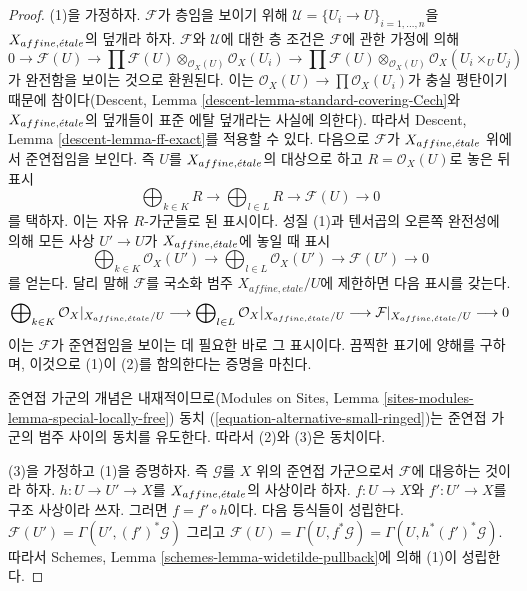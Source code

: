 \begin{proof}
(1)을 가정하자. $\mathcal{F}$가 층임을 보이기 위해
$\mathcal{U}=\{U_i\to U\}_{i=1,\ldots,n}$을
$X_{affine,{\acute{e}tale}}$의 덮개라 하자. $\mathcal{F}$와 $\mathcal{U}$에
대한 층 조건은 $\mathcal{F}$에 관한 가정에 의해
$$
0 \to \mathcal{F}(U) \to
\prod \mathcal{F}(U) \otimes_{\mathcal{O}_X(U)} \mathcal{O}_X(U_i) \to
\prod \mathcal{F}(U) \otimes_{\mathcal{O}_X(U)} \mathcal{O}_X(U_i \times_U U_j)
$$
가 완전함을 보이는 것으로 환원된다. 이는
$\mathcal{O}_X(U)\to\prod\mathcal{O}_X(U_i)$가 충실 평탄이기 때문에
참이다(Descent, Lemma \ref{descent-lemma-standard-covering-Cech}와
$X_{affine,{\acute{e}tale}}$의 덮개들이 표준 에탈 덮개라는 사실에 의한다).
따라서 Descent, Lemma \ref{descent-lemma-ff-exact}를 적용할 수 있다.
다음으로 $\mathcal{F}$가 $X_{affine,{\acute{e}tale}}$ 위에서 준연접임을 보인다.
즉 $U$를 $X_{affine,{\acute{e}tale}}$의 대상으로 하고 $R=\mathcal{O}_X(U)$로
놓은 뒤 표시
$$
\bigoplus\nolimits_{k \in K} R
\longrightarrow
\bigoplus\nolimits_{l \in L} R
\longrightarrow
\mathcal{F}(U)
\longrightarrow 0
$$
를 택하자. 이는 자유 $R$-가군들로 된 표시이다. 성질 (1)과 텐서곱의
오른쪽 완전성에 의해 모든 사상 $U'\to U$가 $X_{affine,{\acute{e}tale}}$에
놓일 때 표시
$$
\bigoplus\nolimits_{k \in K} \mathcal{O}_X(U')
\longrightarrow
\bigoplus\nolimits_{l \in L} \mathcal{O}_X(U')
\longrightarrow
\mathcal{F}(U')
\longrightarrow 0
$$
를 얻는다. 달리 말해 $\mathcal{F}$를 국소화 범주
$X_{affine, etale}/U$에 제한하면 다음 표시를 갖는다.
$$
\bigoplus\nolimits_{k \in K} \mathcal{O}_X|_{X_{affine, {\acute{e}tale}}/U}
\longrightarrow
\bigoplus\nolimits_{l \in L} \mathcal{O}_X|_{X_{affine, {\acute{e}tale}}/U}
\longrightarrow
\mathcal{F}|_{X_{affine, {\acute{e}tale}}/U}
\longrightarrow 0
$$
이는 $\mathcal{F}$가 준연접임을 보이는 데 필요한 바로 그 표시이다.
끔찍한 표기에 양해를 구하며, 이것으로 (1)이 (2)를 함의한다는 증명을
마친다.

\medskip\noindent
준연접 가군의 개념은 내재적이므로(Modules on Sites, Lemma
\ref{sites-modules-lemma-special-locally-free}) 동치
(\ref{equation-alternative-small-ringed})는 준연접 가군의 범주 사이의
동치를 유도한다. 따라서 (2)와 (3)은 동치이다.

\medskip\noindent
(3)을 가정하고 (1)을 증명하자. 즉 $\mathcal{G}$를 $X$ 위의 준연접
가군으로서 $\mathcal{F}$에 대응하는 것이라 하자.
$h:U\to U'\to X$를 $X_{affine,{\acute{e}tale}}$의 사상이라 하자.
$f:U\to X$와 $f':U'\to X$를 구조 사상이라 쓰자.
그러면 $f=f'\circ h$이다. 다음 등식들이 성립한다.
$\mathcal{F}(U')=\Gamma(U',(f')^*\mathcal{G})$ 그리고
$\mathcal{F}(U)=\Gamma(U,f^*\mathcal{G})=\Gamma(U,h^*(f')^*\mathcal{G})$.
따라서 Schemes, Lemma \ref{schemes-lemma-widetilde-pullback}에 의해 (1)이
성립한다.
\end{proof}

